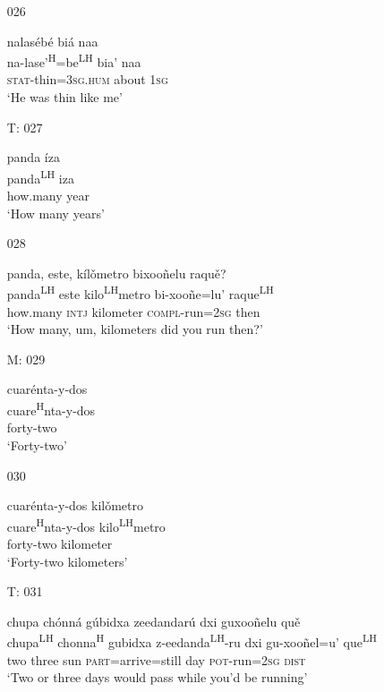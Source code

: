 \begin{itemize}
\item[026]
    
\glll nalas\'{e}b\'{e} bi\'{a} naa\\
na-lase'\textsuperscript{H}=be\textsuperscript{LH} bia' naa\\
\textsc{stat}-thin=\textsc{3sg.hum} about \textsc{1sg}\\
\glt `He was thin like me'
 


\item[T: 027]
   
\glll panda \'{i}za\\
panda\textsuperscript{LH} iza\\
how.many year\\
\glt `How many years'
 

\item[028]
   
\glll panda, este, k\'{i}l\v{o}metro bixoo\~{n}elu raqu\v{e}?\\
panda\textsuperscript{LH}  este kilo\textsuperscript{LH}metro bi-xoo\~{n}e=lu' raque\textsuperscript{LH} \\
how.many \textsc{intj} kilometer \textsc{compl}-run=\textsc{2sg} then\\
\glt `How many, um, kilometers did you run then?'
 

\item[M: 029]
  
\glll cuar\'{e}nta-y-dos\\
cuare\textsuperscript{H}nta-y-dos\\
forty-two\\
\glt `Forty-two'
 

\item[030]
  
\glll cuar\'{e}nta-y-dos kil\v{o}metro\\
cuare\textsuperscript{H}nta-y-dos kilo\textsuperscript{LH}metro\\
forty-two kilometer\\
\glt `Forty-two kilometers'
 

\item[T: 031]
 
\glll  chupa ch\'{o}nn\'{a} g\'{u}bidxa zeedandar\'{u} dxi guxoo\~{n}elu qu\v{e}\\
chupa\textsuperscript{LH} chonna\textsuperscript{H} gubidxa z-eedanda\textsuperscript{LH}-ru dxi gu-xoo\~{n}el=u' que\textsuperscript{LH}\\
two three sun \textsc{part}=arrive=still day \textsc{pot}-run=\textsc{2sg} \textsc{dist}\\
\glt `Two or three days would pass while you'd be running'
 


\end{itemize}
